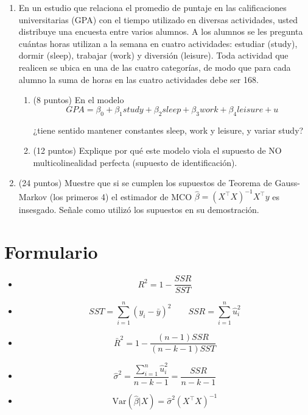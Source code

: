 \documentclass[10pt,a4paper]{article}
\begin{document}
\begin{enumerate}
\begin{enumerate}
$$ \sum_{i=1}^{n} (y_i - \bar{y})^2=6.800$$
Determine la varianza de los estimadores de la regresión MCO.


\end{enumerate}

\item En un estudio que relaciona el promedio de puntaje en las calificaciones universitarias (GPA) con el
tiempo utilizado en diversas actividades, usted distribuye una encuesta entre varios alumnos.
A los alumnos se les pregunta cuántas horas utilizan a la semana en cuatro actividades: estudiar (study),
dormir (sleep), trabajar (work) y diversión (leisure). Toda actividad que realicen se ubica en una de las cuatro categorías,
de modo que para cada alumno la suma de horas en las cuatro actividades debe ser 168.
\begin{enumerate}
    \item(8 puntos) En el modelo
$$GPA=\beta_0 +\beta_1 study+\beta_2 sleep+\beta_3 work +\beta_4leisure+ u$$

¿tiene sentido mantener constantes sleep, work y leisure, y variar study?


\item (12 puntos) Explique por qué este modelo viola el supuesto de NO multicolinealidad perfecta (supuesto de identificación).


\end{enumerate}

\item (24 puntos) Muestre que si se cumplen los supuestos de Teorema de Gauss-Markov (los primeros 4) el estimador de MCO $ \hat{\beta} = (X^{\top}X)^{-1}X^{\top}y$
es insesgado. Señale como utilizó los supuestos en su demostración.


\end{enumerate}

\section{Formulario}


\begin{itemize}
    \item \[ R^2  = 1 - \frac{SSR}{SST} \] 
\item  $$SST = \sum_{i=1}^{n} (y_i - \bar{y})^2 \quad \quad SSR = \sum_{i=1}^{n}  \hat{u}_i^2 $$
    \item \[ \bar{R}^2 =  1 - \frac{(n-1)SSR}{(n-k-1)SST} \]

    \item  $$\hat{\sigma}^2 = \frac{\sum_{i=1}^{n} \hat{u}_i^2 }{n-k-1}= \frac{SSR}{n - k - 1}$$
    \item \[
\text{Var}(\hat{\beta}|X) = \hat{\sigma}^2(X^{\top}X)^{-1}
\]
    \end{itemize}

    
\end{document}
